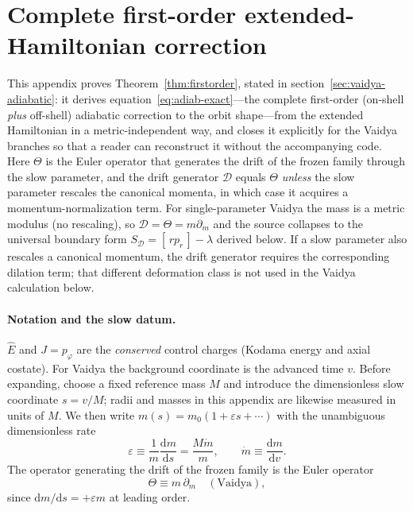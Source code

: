 \documentclass[12pt]{iopart}
\newcommand{\Ehat}{\hat E}
\newcommand{\dd}{\mathrm{d}}
\theoremstyle{plain}
\theoremstyle{definition}
\theoremstyle{plain}
\theoremstyle{remark}
\begin{document}
\FloatBarrier


\section{Complete first-order extended-Hamiltonian correction}
\label{app:firstorder}

This appendix proves Theorem~\ref{thm:firstorder}, stated in section~\ref{sec:vaidya-adiabatic}: it derives
equation~\eqref{eq:adiab-exact}---the complete first-order (on-shell \emph{plus} off-shell)
adiabatic correction to the orbit shape---from the extended Hamiltonian in a
metric-independent way, and closes it explicitly for the Vaidya branches so that a reader
can reconstruct it without the accompanying code. Here $\Theta$ is the Euler operator that
generates the drift of the frozen family through the slow parameter, and the drift
generator $\mathcal D$ equals $\Theta$ \emph{unless} the slow parameter rescales the
canonical momenta, in which case it acquires a momentum-normalization term. For
single-parameter Vaidya the mass is a metric modulus (no rescaling), so
$\mathcal D=\Theta=m\partial_m$ and the source collapses to the universal boundary form
$S_{\mathcal D}=[\,rp_r\,]-\lambda$ derived below. If a slow parameter also rescales a
canonical momentum, the drift generator requires the corresponding dilation term; that
different deformation class is not used in the Vaidya calculation below.

\paragraph{Notation and the slow datum.} $\Ehat$ and $J=p_\varphi$ are the
\emph{conserved} control charges (Kodama energy and axial costate). For Vaidya the
background coordinate is the advanced time $v$. Before expanding, choose a fixed
reference mass $M$ and introduce the dimensionless slow coordinate $s=v/M$; radii and
masses in this appendix are likewise measured in units of $M$. We then write
$m(s)=m_0(1+\varepsilon s+\cdots)$ with the unambiguous dimensionless rate
\[
    \varepsilon\equiv\frac{1}{m}\frac{\dd m}{\dd s}
    =\frac{M\dot m}{m},\qquad \dot m\equiv\frac{\dd m}{\dd v}.
\]
The operator generating the drift of the frozen family is the
Euler operator
\begin{equation}
    \Theta\equiv m\,\partial_m\quad(\text{Vaidya}),
    \label{eq:theta-op}
\end{equation}
since $\dd m/\dd s=+\varepsilon m$ at leading order.
\end{document}
